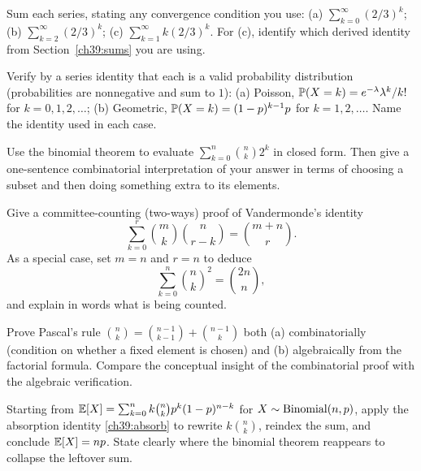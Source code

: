 \begin{exercise}
Sum each series, stating any convergence condition you use:
(a) $\sum_{k=0}^{\infty}(2/3)^k$;\;
(b) $\sum_{k=2}^{\infty}(2/3)^k$;\;
(c) $\sum_{k=1}^{\infty}k(2/3)^{k}$.
For (c), identify which derived identity from Section~\ref{ch39:sums} you are
using.
\end{exercise}

\begin{exercise}
Verify by a series identity that each is a valid probability distribution
(probabilities are nonnegative and sum to $1$):
(a) Poisson, $\P(X=k)=e^{-\lambda}\lambda^k/k!$ for $k=0,1,2,\dots$;\;
(b) Geometric, $\P(X=k)=(1-p)^{k-1}p$ for $k=1,2,\dots$. Name the identity
used in each case.
\end{exercise}

\begin{exercise}
Use the binomial theorem to evaluate $\sum_{k=0}^{n}\binom{n}{k}2^{k}$ in
closed form. Then give a one-sentence combinatorial interpretation of your
answer in terms of choosing a subset and then doing something extra to its
elements.
\end{exercise}

\begin{exercise}
Give a committee-counting (two-ways) proof of Vandermonde's identity
\[
  \sum_{k=0}^{r}\binom{m}{k}\binom{n}{r-k} = \binom{m+n}{r}.
\]
As a special case, set $m=n$ and $r=n$ to deduce
\[
  \sum_{k=0}^{n}\binom{n}{k}^2 = \binom{2n}{n},
\]
and explain in words what is being counted.
\end{exercise}

\begin{exercise}
Prove Pascal's rule $\binom{n}{k}=\binom{n-1}{k-1}+\binom{n-1}{k}$ both
(a) combinatorially (condition on whether a fixed element is chosen) and
(b) algebraically from the factorial formula. Compare the conceptual insight
of the combinatorial proof with the algebraic verification.
\end{exercise}

\begin{exercise}
Starting from $\E[X]=\sum_{k=0}^{n}k\binom{n}{k}p^k(1-p)^{n-k}$ for
$X\sim\Bin(n,p)$, apply the absorption identity \eqref{ch39:absorb} to rewrite
$k\binom{n}{k}$, reindex the sum, and conclude $\E[X]=np$. State clearly where
the binomial theorem reappears to collapse the leftover sum.
\end{exercise}


